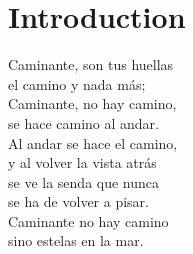 \chapter*{Introduction}
\renewcommand\chapterillustration{REM/REM}
\ThisULCornerWallPaper{1}{\chapterillustration}


\begin{fquote}
	\begin{flushright}
		Caminante, son tus huellas\\
		el camino y nada más;\\
		Caminante, no hay camino,\\
		se hace camino al andar.\\
		Al andar se hace el camino,\\
		y al volver la vista atrás\\
		se ve la senda que nunca\\
		se ha de volver a pisar.\\
		Caminante no hay camino\\
		sino estelas en la mar.\\
	\end{flushright}
\end{fquote}

\lettrine[lines=4, slope=-0.5em]{}{}